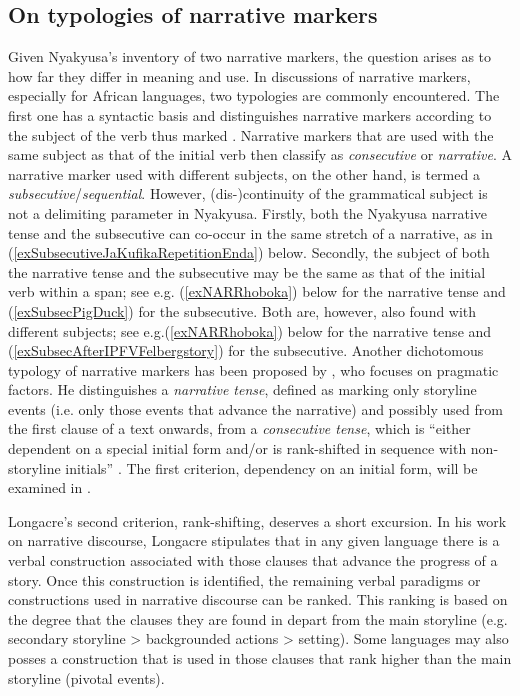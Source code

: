 \subsection{On typologies of narrative markers}\label{NarrativeMarkersTypologies}
Given Nyakyusa's inventory of two narrative markers, the question arises as to how far they differ in meaning and use. In discussions of narrative markers, especially for African languages, two typologies are commonly encountered. The first one has a syntactic basis and distinguishes narrative markers according to the subject of the verb thus marked \citep[19]{RoseEtal2002}. Narrative markers that are used with the same subject as that of the initial verb then classify as \textit{consecutive} or \textit{narrative}. A narrative marker used with different subjects, on the other hand, is termed a \textit{subsecutive}/\textit{sequential}. However, \mbox{(dis-)}continuity of the grammatical subject is not a delimiting parameter in Nyakyusa. Firstly, both the Nyakyusa narrative tense and the subsecutive can co-occur in the same stretch of a narrative, as in (\ref{exSubsecutiveJaKufikaRepetitionEnda}) below. Secondly, the subject of both the narrative tense and the subsecutive may be the same as that of the initial verb within a span; see e.g. (\ref{exNARRhoboka}) below for the narrative tense and (\ref{exSubsecPigDuck}) for the subsecutive. Both are, however, also found with different subjects; see e.g.(\ref{exNARRhoboka}) below for the narrative tense and (\ref{exSubsecAfterIPFVFelbergstory}) for the subsecutive. 
Another dichotomous typology of narrative markers has been proposed by \citet{LongacreR1990}, who focuses on pragmatic factors. He distinguishes a \textit{narrative tense}, defined as marking only storyline events (i.e. only those events that advance the narrative) and possibly used from the first clause of a text onwards, from a \textit{consecutive tense}, which is ``either dependent on a special initial form and/or is rank-shifted in sequence with non-storyline initials'' \citep[109]{LongacreR1990}. The first criterion, dependency on an initial form, will be examined in  .

Longacre's second criterion, rank-shifting, deserves a short excursion. In his work on narrative discourse, Longacre stipulates that in any given language there is a verbal construction associated with those clauses that advance the progress of a story. Once this construction is identified, the remaining verbal paradigms or constructions used in narrative discourse can be ranked. This ranking is based on the degree that the clauses they are found in depart from the main storyline (e.g. secondary storyline > backgrounded actions > setting). Some languages may also posses a construction that is used in those clauses that rank higher than the main storyline (pivotal events). 
